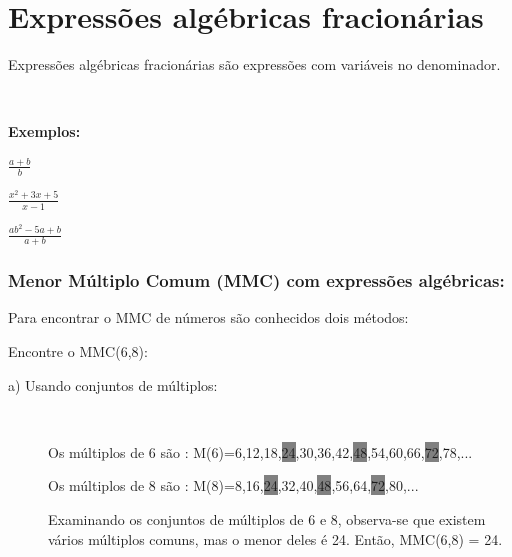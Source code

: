 \section{Expressões algébricas fracionárias}

Expressões algébricas fracionárias são expressões com variáveis no denominador.

~~

\noindent\textbf{Exemplos:}
\begin{multicols}{3}
\begin{enumerate}[label=\arabic*)]{\large
\item $\frac{a+b}{b}$

\item $\frac{x^2+3x+5}{x-1}$

\item $\frac{ab^2-5a+b}{a+b}$

}\end{enumerate}
\end{multicols}

\subsubsection{Menor Múltiplo Comum (MMC) com expressões algébricas:}

Para encontrar o MMC de números são conhecidos dois métodos:

Encontre o MMC(6,8):

\begin{description}
    \item [a) Usando conjuntos de múltiplos:]~
        
    Os múltiplos de 6 são : M(6)={6,12,18,\colorbox{gray}{24},30,36,42,\colorbox{gray}{48},54,60,66,\colorbox{gray}{72},78,...}

    Os múltiplos de 8 são : M(8)={8,16,\colorbox{gray}{24},32,40,\colorbox{gray}{48},56,64,\colorbox{gray}{72},80,...}

    Examinando os conjuntos de múltiplos de 6 e 8, observa-se que existem vários múltiplos comuns, mas o menor deles é 24. Então, MMC(6,8) = 24.
\end{description}

